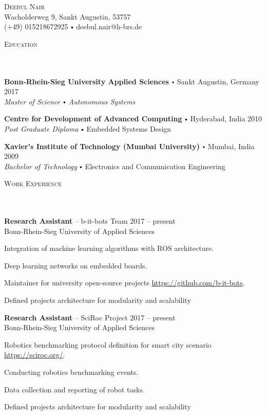 \documentclass{article}
\newcommand{\contact}[3]{
\vspace*{5pt}
\begin{center}
{\Huge \scshape {#1}}\\
\vspace{3pt}
#2 
\vspace{2pt}
#3
\end{center}
\vspace*{-8pt}
}
\newcommand{\header}[1]{{
\hspace*{-15pt}\vspace*{6pt} \textsc{#1}} \vspace*{-6pt} 
\lineunder
}
\newcommand{\lineunder}{
\vspace*{-8pt} \\ \hspace*{-18pt} 
\hrulefill \\
}
\newcommand{\content}{
\vspace*{2pt}%
}
\newcommand{\school}[4]{
\textbf{#1} \labelitemi #2 \hfill #3 \\ #4 \vspace*{5pt}
}
\newcommand{\employer}[4]{{
\vspace*{2pt}%
\textbf{#1} #2 \hfill #3\\ #4 \vspace*{2pt}}
}
\renewcommand{\labelitemi}{
$\vcenter{\hbox{\tiny$\bullet$}}$\hspace*{3pt}
}
\renewcommand{\labelitemii}{
$\vcenter{\hbox{\tiny$\bullet$}}$\hspace*{-3pt}
}
\newenvironment{bullet-list-minor}{
\begin{list}{\labelitemii}{\setlength\leftmargin{15pt} 
\topsep 0pt \itemsep -2pt}}{\vspace*{4pt}\end{list}
}
\begin{document}
\small
\smallskip
\vspace*{-44pt}

\contact{Deebul Nair}
{Wacholderweg 9, Sankt Augustin, 53757\\}
{(+49) 015218672925 \labelitemi deebul.nair@h-brs.de}
\vspace{15pt}

\vspace*{4pt}%

\vspace*{4pt}%
\header{Education}
    \school{Bonn-Rhein-Sieg University Applied Sciences}{Sankt Augustin, Germany}{ 2017}
    {\textit{Master of Science \labelitemi Autonomous Systems}}
    
    \school{Centre for Development of Advanced Computing}{Hyderabad, India}{2010}
    {\textit{Post Graduate Diploma} \labelitemi Embedded Systems Design }

    \school{Xavier's Institute of Technology (Mumbai University)}{Mumbai, India}{2009}
    {\textit{Bachelor of Technology} \labelitemi Electronics and Communication Engineering }

\vspace*{4pt}%
\header{Work Experience}
    \employer{Research Assistant}{-- b-it-bots Team}{2017 -- present}
    {Bonn-Rhein-Sieg University of Applied Sciences}
	\begin{bullet-list-minor}
	\item Integration of machine learning algorithms with ROS architecture.
    \item Deep learning networks on embedded boards.
    \item Maintainer for university open-source projects \url{https://github.com/b-it-bots}.
	\item Defined projects architecture for modularity and scalability
    \end{bullet-list-minor}
    \employer{Research Assistant}{-- SciRoc Project}{2017 -- present}
    {Bonn-Rhein-Sieg University of Applied Sciences}
	\begin{bullet-list-minor}
	\item Robotics benchmarking protocol definition for smart city scenario \url{https://sciroc.org/}. 
    \item Conducting robotics benchmarking events.
    \item Data collection and reporting of robot tasks.
	\item Defined projects architecture for modularity and scalability
    \end{bullet-list-minor}
\end{document}
